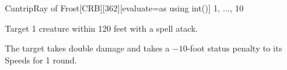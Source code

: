 
\begin{card-collection}{Cantrip}{\level}{Ray of Frost}[CRB][362]{[evaluate=\level as \bonus using int()] \level}{1, ..., 10}




Target 1 creature within 120 feet with a spell atack.


 The target takes double damage
and takes a \(-10\)-foot status penalty to its Speeds for 1 round.

\end{card-collection}%